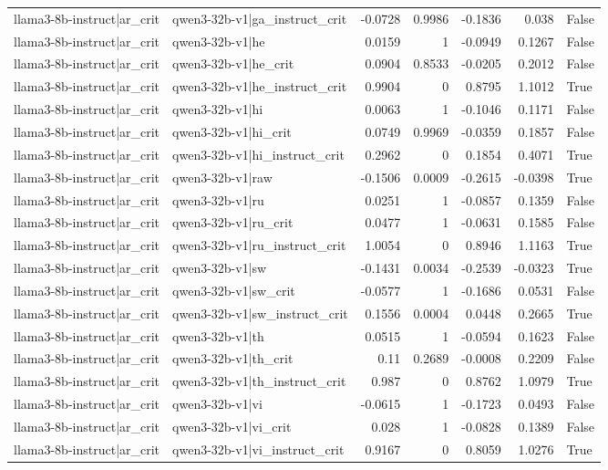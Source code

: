 \begin{table}
\begin{tabular}{l l r r r r l}
llama3-8b-instruct|ar_crit & qwen3-32b-v1|ga_instruct_crit & -0.0728 & 0.9986 & -0.1836 & 0.038 & False \\
llama3-8b-instruct|ar_crit & qwen3-32b-v1|he & 0.0159 & 1 & -0.0949 & 0.1267 & False \\
llama3-8b-instruct|ar_crit & qwen3-32b-v1|he_crit & 0.0904 & 0.8533 & -0.0205 & 0.2012 & False \\
llama3-8b-instruct|ar_crit & qwen3-32b-v1|he_instruct_crit & 0.9904 & 0 & 0.8795 & 1.1012 & True \\
llama3-8b-instruct|ar_crit & qwen3-32b-v1|hi & 0.0063 & 1 & -0.1046 & 0.1171 & False \\
llama3-8b-instruct|ar_crit & qwen3-32b-v1|hi_crit & 0.0749 & 0.9969 & -0.0359 & 0.1857 & False \\
llama3-8b-instruct|ar_crit & qwen3-32b-v1|hi_instruct_crit & 0.2962 & 0 & 0.1854 & 0.4071 & True \\
llama3-8b-instruct|ar_crit & qwen3-32b-v1|raw & -0.1506 & 0.0009 & -0.2615 & -0.0398 & True \\
llama3-8b-instruct|ar_crit & qwen3-32b-v1|ru & 0.0251 & 1 & -0.0857 & 0.1359 & False \\
llama3-8b-instruct|ar_crit & qwen3-32b-v1|ru_crit & 0.0477 & 1 & -0.0631 & 0.1585 & False \\
llama3-8b-instruct|ar_crit & qwen3-32b-v1|ru_instruct_crit & 1.0054 & 0 & 0.8946 & 1.1163 & True \\
llama3-8b-instruct|ar_crit & qwen3-32b-v1|sw & -0.1431 & 0.0034 & -0.2539 & -0.0323 & True \\
llama3-8b-instruct|ar_crit & qwen3-32b-v1|sw_crit & -0.0577 & 1 & -0.1686 & 0.0531 & False \\
llama3-8b-instruct|ar_crit & qwen3-32b-v1|sw_instruct_crit & 0.1556 & 0.0004 & 0.0448 & 0.2665 & True \\
llama3-8b-instruct|ar_crit & qwen3-32b-v1|th & 0.0515 & 1 & -0.0594 & 0.1623 & False \\
llama3-8b-instruct|ar_crit & qwen3-32b-v1|th_crit & 0.11 & 0.2689 & -0.0008 & 0.2209 & False \\
llama3-8b-instruct|ar_crit & qwen3-32b-v1|th_instruct_crit & 0.987 & 0 & 0.8762 & 1.0979 & True \\
llama3-8b-instruct|ar_crit & qwen3-32b-v1|vi & -0.0615 & 1 & -0.1723 & 0.0493 & False \\
llama3-8b-instruct|ar_crit & qwen3-32b-v1|vi_crit & 0.028 & 1 & -0.0828 & 0.1389 & False \\
llama3-8b-instruct|ar_crit & qwen3-32b-v1|vi_instruct_crit & 0.9167 & 0 & 0.8059 & 1.0276 & True \\

\end{tabular}
\end{table}
